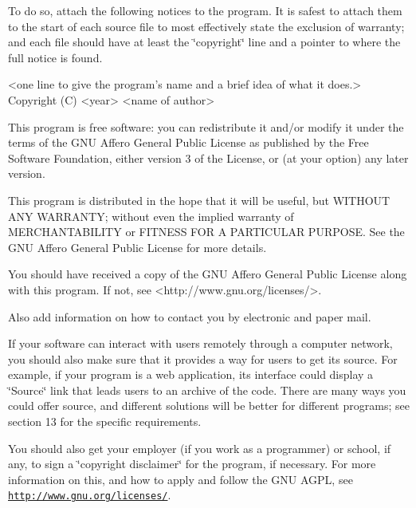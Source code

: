 To do so, attach the following notices to the program. It is safest to attach them to the start of each source file to most effectively state the exclusion of warranty; and each file should have at least the \char`\"{}copyright\char`\"{} line and a pointer to where the full notice is found. \begin{DoxyVerb}<one line to give the program's name and a brief idea of what it does.>
Copyright (C) <year>  <name of author>

This program is free software: you can redistribute it and/or modify
it under the terms of the GNU Affero General Public License as published by
the Free Software Foundation, either version 3 of the License, or
(at your option) any later version.

This program is distributed in the hope that it will be useful,
but WITHOUT ANY WARRANTY; without even the implied warranty of
MERCHANTABILITY or FITNESS FOR A PARTICULAR PURPOSE.  See the
GNU Affero General Public License for more details.

You should have received a copy of the GNU Affero General Public License
along with this program.  If not, see <http://www.gnu.org/licenses/>.
\end{DoxyVerb}


Also add information on how to contact you by electronic and paper mail.

If your software can interact with users remotely through a computer network, you should also make sure that it provides a way for users to get its source. For example, if your program is a web application, its interface could display a \char`\"{}\-Source\char`\"{} link that leads users to an archive of the code. There are many ways you could offer source, and different solutions will be better for different programs; see section 13 for the specific requirements.

You should also get your employer (if you work as a programmer) or school, if any, to sign a \char`\"{}copyright disclaimer\char`\"{} for the program, if necessary. For more information on this, and how to apply and follow the G\-N\-U A\-G\-P\-L, see \href{http://www.gnu.org/licenses/}{\tt http\-://www.\-gnu.\-org/licenses/}. 